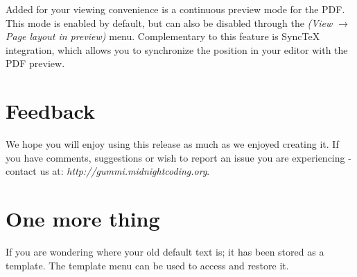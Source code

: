 \documentclass[11pt]{article}
\begin{document}
Added for your viewing convenience is a continuous preview mode for the PDF. This mode is enabled by default, but can also be disabled through the \emph{(View $\rightarrow$ Page layout in preview)} menu. Complementary to this feature is SyncTeX integration, which allows you to synchronize the position in your editor with the PDF preview. 

\section{Feedback}
We hope you will enjoy using this release as much as we enjoyed creating it. If you have comments, suggestions or wish to report an issue you are experiencing - contact us at: \emph{http://gummi.midnightcoding.org}.

\section{One more thing}
If you are wondering where your old default text is; it has been stored as a template. The template menu can be used to access and restore it. 
\end{document}
